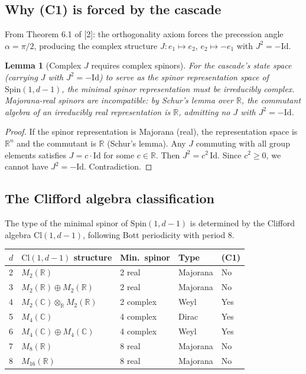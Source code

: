 \documentclass[12pt,a4paper]{article}
\newtheorem{lemma}[theorem]{Lemma}
\begin{document}
\subsection{Why (C1) is forced by the cascade}

From Theorem 6.1 of [2]: the orthogonality axiom forces the precession angle $\alpha = \pi/2$,
producing the complex structure $J: e_1 \mapsto e_2$, $e_2 \mapsto -e_1$ with $J^2 = -\text{Id}$.

\begin{lemma}[Complex $J$ requires complex spinors]
For the cascade's state space (carrying
$J$ with $J^2 = -\text{Id}$) to serve as the spinor representation space of $\text{Spin}(1, d - 1)$, the minimal
spinor representation must be irreducibly complex. Majorana-real spinors are incompatible:
by Schur's lemma over $\mathbb{R}$, the commutant algebra of an irreducibly real representation is
$\mathbb{R}$, admitting no $J$ with $J^2 = -\text{Id}$.
\end{lemma}

\begin{proof}
If the spinor representation is Majorana (real), the representation space is $\mathbb{R}^n$ and
the commutant is $\mathbb{R}$ (Schur's lemma). Any $J$ commuting with all group elements satisfies
$J = c \cdot \text{Id}$ for some $c \in \mathbb{R}$. Then $J^2 = c^2\,\text{Id}$. Since $c^2 \geq 0$, we cannot have $J^2 = -\text{Id}$.
Contradiction.
\end{proof}

\subsection{The Clifford algebra classification}

The type of the minimal spinor of $\text{Spin}(1, d - 1)$ is determined by the Clifford algebra
$\text{Cl}(1, d - 1)$, following Bott periodicity with period 8.

\begin{center}
\begin{tabular}{lllll}
\hline
$d$ & $\text{Cl}(1, d - 1)$ structure & Min.\ spinor & Type & (C1) \\
\hline
2 & $M_2(\mathbb{R})$ & 2 real & Majorana & No \\
3 & $M_2(\mathbb{R}) \oplus M_2(\mathbb{R})$ & 2 real & Majorana & No \\
4 & $M_2(\mathbb{C}) \otimes_\mathbb{R} M_2(\mathbb{R})$ & 2 complex & Weyl & Yes \\
5 & $M_4(\mathbb{C})$ & 4 complex & Dirac & Yes \\
6 & $M_4(\mathbb{C}) \oplus M_4(\mathbb{C})$ & 4 complex & Weyl & Yes \\
7 & $M_8(\mathbb{R})$ & 8 real & Majorana & No \\
8 & $M_{16}(\mathbb{R})$ & 8 real & Majorana & No \\
\hline
\end{tabular}
\end{center}
\end{document}
